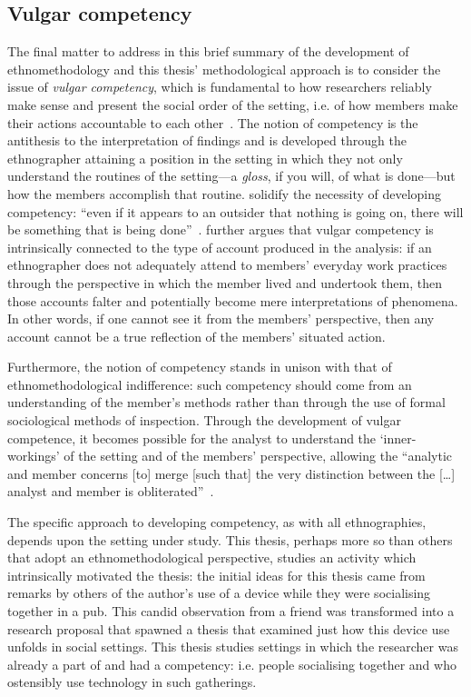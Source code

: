 \subsection{Vulgar competency}\label{sec:background approach em comptency}
\begin{revisedsubmission}
The final matter to address in this brief summary of the development of ethnomethodology and this thesis' methodological approach is to consider the issue of \textit{vulgar competency}, which is fundamental to how researchers reliably make sense and present the social order of the setting, i.e. of how members make their actions accountable to each other~\citep{Garfinkel1992a}.
The notion of competency is the antithesis to the interpretation of findings and is developed through the ethnographer attaining a position in the setting in which they not only understand the routines of the setting---a \textit{gloss}, if you will, of what is done---but how the members accomplish that routine.
\citet{Button2009} solidify the necessity of developing competency: ``even if it appears to an outsider that nothing is going on, there will be something that is being done''~\citep[p. 86]{Button2009}.
\citet{Slack2000} further argues that vulgar competency is intrinsically connected to the type of account produced in the analysis: if an ethnographer does not adequately attend to members' everyday work practices through the perspective in which the member lived and undertook them, then those accounts falter and potentially become mere interpretations of phenomena.
In other words, if one cannot see it from the members' perspective, then any account cannot be a true reflection of the members' situated action.

Furthermore, the notion of competency stands in unison with that of ethnomethodological indifference: such competency should come from an understanding of the member's methods rather than through the use of formal sociological methods of inspection.
Through the development of vulgar competence, it becomes possible for the analyst to understand the `inner-workings' of the setting and of the members' perspective, allowing the ``analytic and member concerns [to] merge [such that] the very distinction between the [\ldots] analyst and member is obliterated''~\citep[p. 15]{Pollner2012}.

The specific approach to developing competency, as with all ethnographies, depends upon the setting under study.
This thesis, perhaps more so than others that adopt an ethnomethodological perspective, studies an activity which intrinsically motivated the thesis: the initial ideas for this thesis came from remarks by others of the author's use of a device while they were socialising together in a pub.
This candid observation from a friend was transformed into a research proposal that spawned a thesis that examined just how this device use unfolds in social settings. %
This thesis studies settings in which the researcher was already a part of and had a competency: i.e. people socialising together and who ostensibly use technology in such gatherings.
\end{revisedsubmission}


